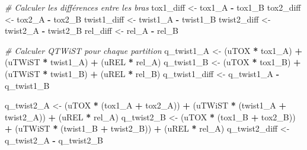 \documentclass[
]{article}
\newenvironment{Shaded}{\begin{snugshade}}{\end{snugshade}}
\newcommand{\CommentTok}[1]{\textcolor[rgb]{0.56,0.35,0.01}{\textit{#1}}}
\newcommand{\NormalTok}[1]{#1}
\newcommand{\OtherTok}[1]{\textcolor[rgb]{0.56,0.35,0.01}{#1}}
\newcommand{\SpecialCharTok}[1]{\textcolor[rgb]{0.81,0.36,0.00}{\textbf{#1}}}
\begin{document}
\begin{Shaded}
\begin{Highlighting}[]
  \CommentTok{\# Calculer les différences entre les bras}
\NormalTok{  tox1\_diff }\OtherTok{\textless{}{-}}\NormalTok{ tox1\_A }\SpecialCharTok{{-}}\NormalTok{ tox1\_B}
\NormalTok{  tox2\_diff }\OtherTok{\textless{}{-}}\NormalTok{ tox2\_A }\SpecialCharTok{{-}}\NormalTok{ tox2\_B}
\NormalTok{  twist1\_diff }\OtherTok{\textless{}{-}}\NormalTok{ twist1\_A }\SpecialCharTok{{-}}\NormalTok{ twist1\_B}
\NormalTok{  twist2\_diff }\OtherTok{\textless{}{-}}\NormalTok{ twist2\_A }\SpecialCharTok{{-}}\NormalTok{ twist2\_B}
\NormalTok{  rel\_diff }\OtherTok{\textless{}{-}}\NormalTok{ rel\_A }\SpecialCharTok{{-}}\NormalTok{ rel\_B}
  
  \CommentTok{\# Calculer QTWiST pour chaque partition}
\NormalTok{  q\_twist1\_A }\OtherTok{\textless{}{-}}\NormalTok{ (uTOX }\SpecialCharTok{*}\NormalTok{ tox1\_A) }\SpecialCharTok{+}\NormalTok{ (uTWiST }\SpecialCharTok{*}\NormalTok{ twist1\_A) }\SpecialCharTok{+}\NormalTok{ (uREL }\SpecialCharTok{*}\NormalTok{ rel\_A)}
\NormalTok{  q\_twist1\_B }\OtherTok{\textless{}{-}}\NormalTok{ (uTOX }\SpecialCharTok{*}\NormalTok{ tox1\_B) }\SpecialCharTok{+}\NormalTok{ (uTWiST }\SpecialCharTok{*}\NormalTok{ twist1\_B) }\SpecialCharTok{+}\NormalTok{ (uREL }\SpecialCharTok{*}\NormalTok{ rel\_B)}
\NormalTok{  q\_twist1\_diff }\OtherTok{\textless{}{-}}\NormalTok{ q\_twist1\_A }\SpecialCharTok{{-}}\NormalTok{ q\_twist1\_B}
  
\NormalTok{  q\_twist2\_A }\OtherTok{\textless{}{-}}\NormalTok{ (uTOX }\SpecialCharTok{*}\NormalTok{ (tox1\_A }\SpecialCharTok{+}\NormalTok{ tox2\_A)) }\SpecialCharTok{+}\NormalTok{ (uTWiST }\SpecialCharTok{*}\NormalTok{ (twist1\_A }\SpecialCharTok{+}\NormalTok{ twist2\_A)) }\SpecialCharTok{+}\NormalTok{ (uREL }\SpecialCharTok{*}\NormalTok{ rel\_A)}
\NormalTok{  q\_twist2\_B }\OtherTok{\textless{}{-}}\NormalTok{ (uTOX }\SpecialCharTok{*}\NormalTok{ (tox1\_B }\SpecialCharTok{+}\NormalTok{ tox2\_B)) }\SpecialCharTok{+}\NormalTok{ (uTWiST }\SpecialCharTok{*}\NormalTok{ (twist1\_B }\SpecialCharTok{+}\NormalTok{ twist2\_B)) }\SpecialCharTok{+}\NormalTok{ (uREL }\SpecialCharTok{*}\NormalTok{ rel\_A)}
\NormalTok{  q\_twist2\_diff }\OtherTok{\textless{}{-}}\NormalTok{ q\_twist2\_A }\SpecialCharTok{{-}}\NormalTok{ q\_twist2\_B}
  

\end{Highlighting}
\end{Shaded}
\end{document}
